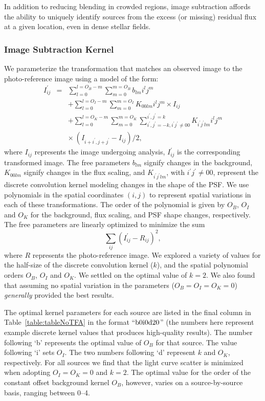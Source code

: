\documentclass[apjl]{emulateapj}
\begin{document}
In addition to reducing blending in crowded regions, image subtraction
affords the ability to uniquely identify sources from the excess (or
missing) residual flux at a given location, even in dense stellar fields.

\subsubsection{Image Subtraction Kernel}

We parameterize the transformation that matches an observed image to the
photo-reference image using a model of the form:
\begin{eqnarray*}
  I^{\prime}_{ij} & = & \sum_{l=0}^{l=O_{B}-m}\sum_{m=0}^{m=O_{B}}b_{lm}i^{l}j^{m} \nonumber \\
 & & + \sum_{l=0}^{l=O_{I}-m}\sum_{m=0}^{m=O_{I}}K_{00lm}i^{l}j^{m} \times I_{ij} \nonumber \\
 & & + \sum_{l=0}^{l=O_{K}-m}\sum_{m=0}^{m=O_{K}}\sum_{i^{\prime}, j^{\prime} =
    -k, i^{\prime}j^{\prime} \neq 00}^{i^{\prime}, j^{\prime} = k} K_{i^{\prime}j^{\prime}lm}i^{l}j^{m} \\
 & & \times \ (I_{i + i^{\prime}, j+j^{\prime}} - I_{ij})/2,
\end{eqnarray*}
where $I_{ij}$ represents the image undergoing analysis,
$I^{\prime}_{ij}$ is the corresponding transformed image.  The free
parameters $b_{lm}$ signify changes in the background, $K_{00lm}$
signify changes in the flux scaling, and $K_{i^{\prime}j^{\prime}lm}$,
with $i^{\prime}j^{\prime} \neq 00$, represent the discrete convolution
kernel modeling changes in the shape of the PSF.  We use polynomials in
the spatial coordinates $(i,j)$ to represent spatial variations in each
of these transformations. The order of the polynomial is given by
$O_{B}$, $O_{I}$ and $O_{K}$ for the background, flux scaling, and PSF
shape changes, respectively. The free parameters are linearly optimized
to minimize the sum
\begin{equation*}
\sum_{ij} (I^{\prime}_{ij} - R_{ij})^2,
\end{equation*}
where $R$ represents the photo-reference image.  We explored a variety
of values for the half-size of the discrete convolution kernel ($k$),
and the spatial polynomial orders $O_{B}$, $O_{I}$ and $O_{K}$. We
settled on the optimal value of $k=2$. We also found that assuming no
spatial variation in the parameters ($O_{B} = O_{I} = O_{K} = 0$)
\emph{generally} provided the best results.

The optimal kernel parameters for each source are listed in the final
column in Table~\ref{table:tableNoTFA} in the format ``$\rm b0i0d20$''
(the numbers here represent example discrete kernel values that produces
high-quality results).  The number following `b' represents the optimal
value of $O_{B}$ for that source.  The value following `i' sets $O_{I}$.
The two numbers following `d' represent $k$ and $O_{K}$,
respectively. For all sources we find that the light curve scatter is
minimized when adopting $O_{I} = O_{K} = 0$ and $k = 2$. The optimal
value for the order of the constant offset background kernel $O_{B}$,
however, varies on a source-by-source basis, ranging between 0--4.
\end{document}
